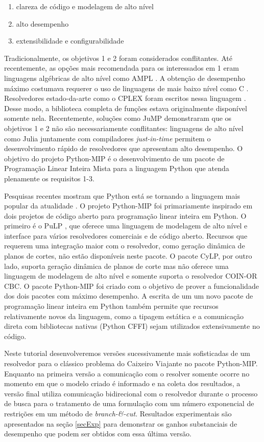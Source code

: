 \documentclass[a4paper,11pt,fleqn]{article}
\begin{document}
\begin{enumerate}
	\item clareza de código e modelagem de alto nível
	\item alto desempenho
	\item extensibilidade e configurabilidade
\end{enumerate}

Tradicionalmente, os objetivos 1 e 2 foram considerados conflitantes.
Até recentemente, as opções mais recomendada para os interessados
em 1 eram linguagens algébricas de alto nível como AMPL \citep{Fourer1987}.
A obtenção de desempenho máximo costumava requerer o uso de linguagens
de mais baixo nível como C \citep{Johnson1991a}. Resolvedores estado-da-arte
como o CPLEX foram escritos nessa linguagem \citep{Bixby2002}. Desse
modo, a biblioteca completa de funções estava originalmente 
disponível somente nela. Recentemente, soluções como JuMP\citep{Dunning2015}
demonstraram que os objetivos 1 e 2 não são necessariamente conflitantes:
linguagens de alto nível como Julia juntamente com compiladores \emph{just-in-time}
permitem o desenvolvimento rápido de resolvedores que apresentam alto
desempenho. O objetivo do projeto Python-MIP é o desenvolvimento de
um pacote de Programação Linear Inteira Mista para a linguagem Python
que atenda plenamente os requisitos 1-3.

Pesquisas recentes mostram que Python está se tornando a linguagem
mais popular da atualidade \citep{pythonEconomist2018}. O projeto Python-MIP foi primariamente inspirado em dois projetos de código aberto para programação linear inteira em Python. O primeiro é o PuLP \citep{Mitchell2009}, que oferece uma linguagem de modelagem de alto nível e interface para vários resolvedores comerciais e de código aberto. Recursos que requerem uma integração maior com o resolvedor, como geração dinâmica de planos de cortes, não estão
disponíveis neste pacote. O pacote CyLP, por outro lado, suporta geração dinâmica de planos de corte mas não oferece uma linguagem de modelagem de alto nível\citep{Towhidi2016} e somente suporta o resolvedor COIN-OR CBC\citep{Forrest2005}. O pacote Python-MIP foi criado com o objetivo de prover a funcionalidade dos dois pacotes com máximo desempenho. A escrita de um um novo pacote de programação linear inteira em Python
também permite que recursos relativamente novos da linguagem, como
a tipagem estática e a comunicação direta com bibliotecas nativas
(Python CFFI) sejam utilizados extensivamente no código.

Neste tutorial desenvolveremos versões sucessivamente mais sofisticadas
de um resolvedor para o clássico problema do Caixeiro Viajante \citep{Dantzig54,Miller1960,Applegate2006} no
pacote Python-MIP. Enquanto na primeira versão a comunicação com o resolver 
somente ocorre no momento em que o modelo criado é informado e na coleta dos resultados, 
a versão final utiliza comunicação bidirecional com o resolvedor durante o processo de busca para o tratamento
de uma formulação com um número exponencial de restrições em um método de \emph{branch-\&-cut}. Resultados experimentais são apresentados na seção \ref{secExp} para demonstrar os ganhos substanciais de desempenho que podem ser obtidos com essa última versão.
\end{document}
